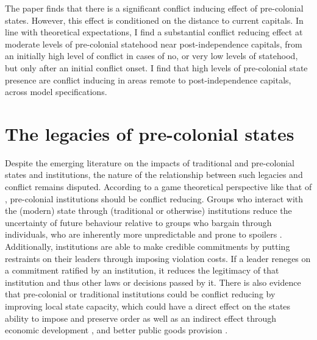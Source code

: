 The paper finds that there is a significant conflict inducing effect of
pre-colonial states. However, this effect is conditioned on the distance to
current capitals. In line with theoretical expectations, I find a substantial
conflict reducing effect at moderate levels of pre-colonial statehood near
post-independence capitals, from an initially high level of conflict in cases of
no, or very low levels of statehood, but only after an initial conflict onset. I
find that high levels of pre-colonial state presence are conflict inducing in
areas remote to post-independence capitals, across model specifications.

\section{The legacies of pre-colonial states}
\label{The legacies of pre-colonial states}

Despite the emerging literature on the impacts of traditional and pre-colonial
states and institutions, the nature of the relationship between such legacies
and conflict remains disputed. According to a game theoretical perspective like
that of \citet{Fearon1995}, pre-colonial institutions should be conflict
reducing. Groups who interact with the (modern) state through (traditional or
otherwise) institutions reduce the uncertainty of future behaviour relative to
groups who bargain through individuals, who are inherently more unpredictable
and prone to spoilers \citep{Wig2016}. Additionally, institutions are able to
make credible commitments by putting restraints on their leaders through
imposing violation costs. If a leader reneges on a commitment ratified by an
institution, it reduces the legitimacy of that institution and thus other laws
or decisions passed by it. There is also evidence that pre-colonial or
traditional institutions could be conflict reducing by improving local state
capacity, which could have a direct effect on the states ability to impose and
preserve order as well as an indirect effect through economic development
\citep{Depetris-Chauvin2016}, and better public goods provision
\citep{Wilfahrt_2021}. 

